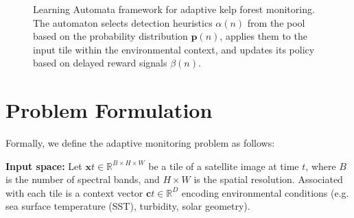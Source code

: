 \documentclass[12pt,oneside]{book}
\begin{document}
\begin{figure}[ht]
    \caption{Learning Automata framework for adaptive kelp forest monitoring. The automaton selects detection heuristics $\alpha(n)$ from the pool based on the probability distribution $\mathbf{p}(n)$, applies them to the input tile within the environmental context, and updates its policy based on delayed reward signals $\beta(n)$.}
    \label{fig:framework-overview}
\end{figure}

\section{Problem Formulation}
\label{sec:problem-formulation}

Formally, we define the adaptive monitoring problem as follows:

\textbf{Input space:} Let $\mathbf{x}t \in \mathbb{R}^{B \times H \times W}$ be a tile of a satellite image at time $t$, where $B$ is the number of spectral bands, and $H \times W$ is the spatial resolution. Associated with each tile is a context vector $\mathbf{c}t \in \mathbb{R}^{D}$ encoding environmental conditions (e.g. sea surface temperature (SST), turbidity, solar geometry).
\end{document}
